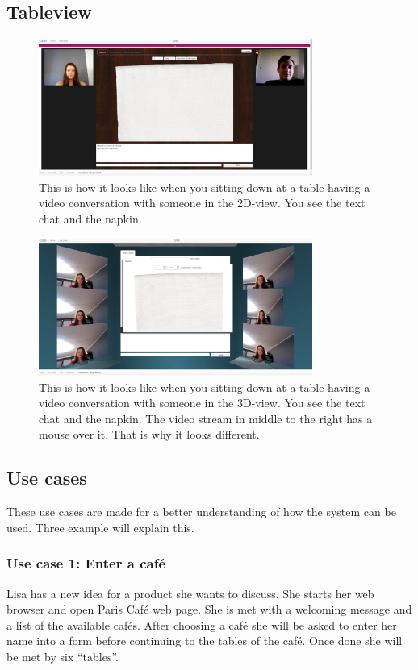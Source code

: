 \documentclass[12pt, titlepage]{article}
\begin{document}
\subsection{Tableview}
\begin{figure}[H]
  \centering
	\includegraphics[width=0.8\textwidth,keepaspectratio]{sittingdown2D.png}
  \caption{This is how it looks like when you sitting down at a table having a video conversation with someone in the 2D-view. You see the text chat and the napkin.}
\end{figure}
\begin{figure}[H]
  \centering
	\includegraphics[width=0.8\textwidth,keepaspectratio]{sittingdown3D.png}
  \caption{This is how it looks like when you sitting down at a table having a video conversation with someone in the 3D-view. You see the text chat and the napkin. The video stream in middle to the right has a mouse over it. That is why it looks different.}
\end{figure}
\subsection{Use cases}
These use cases are made for a better understanding of how the system can be used. Three example will explain this.
\subsubsection{Use case 1: Enter a café}
Lisa has a new idea for a product she wants to discuss. She starts her web browser and open Paris Café web page. She is met with a welcoming message and a list of the available cafés. After choosing a café she will be asked to enter her name into a form before continuing to the tables of the café. Once done she will be met by six “tables”. 
\end{document}
